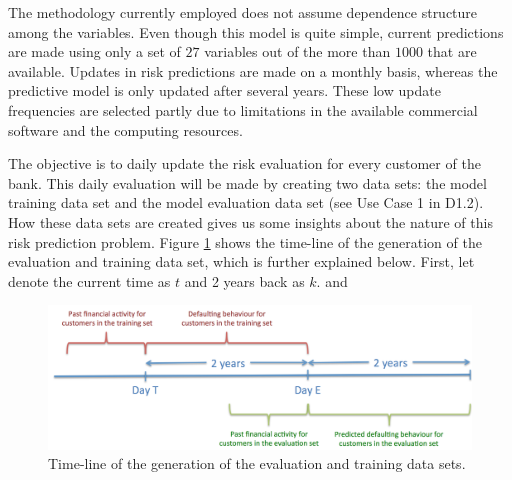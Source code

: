 The methodology currently employed does not assume dependence structure among the variables. Even though this model is quite simple, current predictions are made using only a set of $27$ variables out of the more than $1000$ that are available. Updates in risk predictions are made on a monthly basis, whereas the predictive model is only updated after several years. These low update frequencies are selected partly due to limitations in the available commercial software and the computing resources.

The objective is to daily update the risk evaluation for every customer of the bank. This daily evaluation will be made by creating two data sets: the model training data set and the model evaluation data set (see Use Case 1 in D1.2). How these data sets are created gives us some insights about the nature of this risk prediction problem.  Figure \ref{Figure:CajaMarTimeLine} shows the time-line of the generation of the evaluation and training data set, which is further explained below. First, let denote the current time as $t$ and 2 years back as $k$. and  


\begin{figure}
\begin{center}
\includegraphics[scale=0.4]{figures/CajarMarTimeLine}
\caption{\label{Figure:CajaMarTimeLine}Time-line of the generation of the evaluation and training data sets.}
\end{center}
\end{figure}


